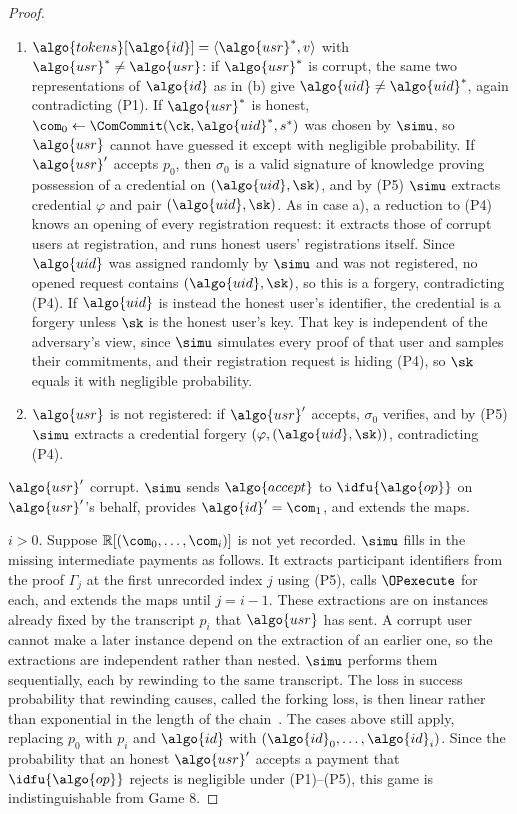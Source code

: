 \begin{proof}
\begin{enumerate}[label=\alph*)]
  \item $\algo{tokens}[\algo{id}] = \langle \algo{usr}^*, v \rangle$ with
$\algo{usr}^* \neq \algo{usr}$: if $\algo{usr}^*$ is corrupt, the same two
representations of $\algo{id}$ as in (b) give $\algo{uid} \neq \algo{uid}^*$, again
contradicting (P1). If $\algo{usr}^*$ is honest, $\com_0 \leftarrow
\ComCommit(\ck, \algo{uid}^*, s^*)$ was chosen by $\simu$, so $\algo{usr}$
cannot have guessed
it except with negligible probability. If $\algo{usr}'$ accepts $p_0$, then
$\sigma_0$ is a valid signature of knowledge proving possession of a credential
on $(\algo{uid}, \sk)$, and by (P5) $\simu$ extracts credential $\varphi$ and
pair $(\algo{uid}, \sk)$. As in case a), a reduction to (P4) knows an opening
of every registration request: it extracts those of corrupt users at
registration, and runs honest users' registrations itself. Since $\algo{uid}$
was assigned randomly by $\simu$ and was not registered, no opened request
contains $(\algo{uid}, \sk)$, so this is a forgery, contradicting (P4).
If $\algo{uid}$ is instead the honest user's identifier, the credential is a
forgery unless $\sk$ is the honest user's key. That key is independent of the
adversary's view, since $\simu$ simulates every proof of that user and samples
their commitments, and their registration request is hiding (P4), so $\sk$
equals it with negligible probability.

  \item $\algo{usr}$ is not registered: if $\algo{usr}'$ accepts, $\sigma_0$
verifies, and by (P5) $\simu$ extracts a credential forgery $(\varphi,
(\algo{uid}, \sk))$, contradicting (P4).

\end{enumerate}

$\algo{usr}'$ corrupt. $\simu$ sends $\algo{accept}$ to $\idfu{\algo{op}}$ on
$\algo{usr}'$'s behalf, provides $\algo{id}' = \com_1$, and extends the maps.

$i > 0$. Suppose $\mathbb{R}[(\com_0, \ldots, \com_i)]$ is not yet recorded.
$\simu$ fills in the missing intermediate payments as follows. It extracts
participant identifiers from the proof $\Gamma_j$ at the first unrecorded index
$j$ using (P5), calls $\OPexecute$ for each, and extends the maps until $j = i -
1$. These extractions are on instances already fixed by the transcript $p_i$
that $\algo{usr}$ has sent. A corrupt user cannot make a later instance depend
on the extraction of an earlier one, so the extractions are independent rather
than nested. $\simu$ performs them sequentially, each by rewinding to the same
transcript. The loss in success probability that rewinding causes, called the
forking loss, is then linear rather than exponential in the length of the
chain~\cite{JC:PoiSte00}. The cases above still apply, replacing $p_0$ with $p_i$ and $\algo{id}$
with $(\algo{id}_0, \ldots, \algo{id}_i)$.  Since the probability that an honest
$\algo{usr}'$ accepts a payment that $\idfu{\algo{op}}$ rejects is negligible
under (P1)--(P5), this game is indistinguishable from Game 8.


\end{proof}
